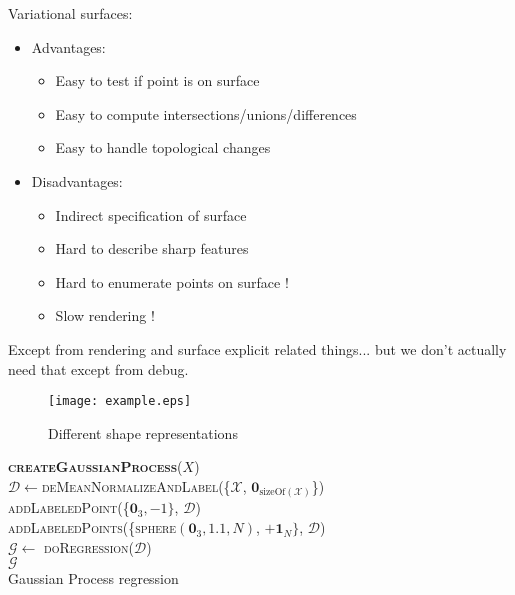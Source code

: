 Variational surfaces:
\begin{itemize}
\item Advantages:
\begin{itemize} 
\item Easy to test if point is on surface
\item Easy to compute intersections/unions/differences
\item Easy to handle topological changes
\end{itemize}
\item Disadvantages:
\begin{itemize}
\item Indirect specification of surface
\item Hard to describe sharp features
\item Hard to enumerate points on surface !
\item Slow rendering !
\end{itemize}
\end{itemize}

Except from rendering and surface explicit related things... but we don't actually need that except from debug.

\begin{figure}
\centering
  \texttt{[image: example.eps]}
  \caption{Different shape representations} \label{fig:shape-comparison}
\end{figure}

\begin{algorithm}[h]
\textbf{\textsc{createGaussianProcess}}($X$)\\ %
\LinesNumbered
\DontPrintSemicolon
\SetAlgoVlined {} 
  $\mathcal{D} \leftarrow$\textsc{deMeanNormalizeAndLabel}(\{$\mathcal{X}$, $\mathbf{0}_{\text{sizeOf}(\mathcal{X})}$\}) \\
  \textsc{addLabeledPoint}(\{$\mathbf{0}_3, -1\}$, $\mathcal{D}$) \\
  \textsc{addLabeledPoints}(\{\textsc{sphere}$(\mathbf{0}_3, 1.1, N)$, $+\mathbf{1}_{N}\}$, $\mathcal{D}$) \\
  $\mathcal{G} \leftarrow$ \textsc{doRegression}($\mathcal{D}$) \\
  \Return $\mathcal{G}$ \\
\caption{Gaussian Process regression} \label{algo:strategy}
\end{algorithm}

